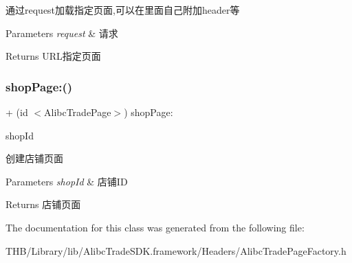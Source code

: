 通过request加载指定页面,可以在里面自己附加header等


\begin{DoxyParams}{Parameters}
{\em request} & 请求\\
\hline
\end{DoxyParams}
\begin{DoxyReturn}{Returns}
U\+R\+L指定页面 
\end{DoxyReturn}
\mbox{\label{interface_alibc_trade_page_factory_a9cf90afb144f2ce51f7ed2dca4166897}} 
\subsubsection{\texorpdfstring{shop\+Page\+:()}{shopPage:()}}
{\footnotesize\ttfamily + (id $<$Alibc\+Trade\+Page$>$) shop\+Page\+: \begin{DoxyParamCaption}\item[{(N\+S\+String $\ast$)}]{shop\+Id }\end{DoxyParamCaption}}

创建店铺页面


\begin{DoxyParams}{Parameters}
{\em shop\+Id} & 店铺\+ID\\
\hline
\end{DoxyParams}
\begin{DoxyReturn}{Returns}
店铺页面 
\end{DoxyReturn}


The documentation for this class was generated from the following file\+:\begin{DoxyCompactItemize}
\item 
T\+H\+B/\+Library/lib/\+Alibc\+Trade\+S\+D\+K.\+framework/\+Headers/Alibc\+Trade\+Page\+Factory.\+h\end{DoxyCompactItemize}
